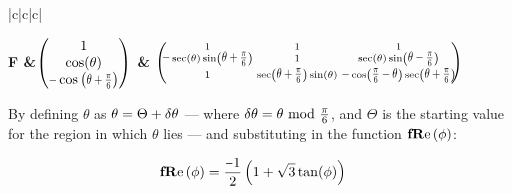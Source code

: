 \begin{tabular}{|c|c|c|}
\hline \rule[-2ex]{0pt}{5.5ex} \bf{F} &\( 
\left(\!\!\!
\begin{array}{c}
 1 \\
 \cos (\theta ) \\
 \um\cosine{\theta +\Pii{6}} \\
\end{array}
\!\!\!\right)\)   & \( \left(\!\!\!
\begin{smallmatrix}
 1 & 1 & 1 \\
 \um\sec (\theta ) \sine{\theta +\Pii{6}} & 1 & \sec (\theta ) \sine{\theta-\Pii{6}} \\
 1 & \secant{\theta +\Pii{6}} \sin (\theta ) & \um\cosine{\Pii{6}-\theta } \secant{\theta +\Pii{6}} \\
\end{smallmatrix}
\!\!\!\right)  \)  \\ 
\hline 
\end{tabular} 

By defining $\theta$ as $\theta  = \Theta + \delta\theta$ --- where $\thetaA = \theta \!\!\mod \Pii{6}$, and $\Theta$ is the starting value for the region in which $\theta$ lies --- and substituting in the function $\fRe[\phi] $:

\begin{align}\label{eq:fReDef}
\fRe[\phi] &= \frac{\um 1}{2} \left(1+\sqrt{3} \tan (\phi )\right) 
\end{align}

